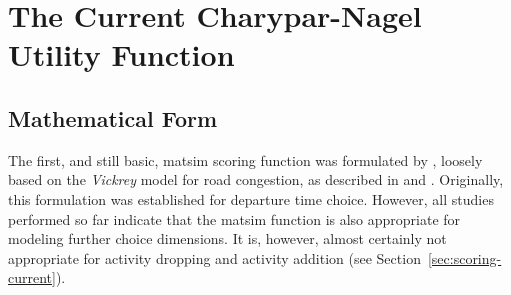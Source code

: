 \section{The Current Charypar-Nagel Utility Function}
\label{sec:charyparnagel}
\subsection{Mathematical Form}
\label{sec:mathematical-form}

The first, and still basic, \gls{matsim} scoring function was formulated by \citet[][]{CharyparNagel2005ga4acts}, loosely based on the \emph{Vickrey} model for road congestion, as described in \citet[][]{Vickrey_TAER_1969} and \citet[][]{ArnottEtAl_TAER_1993}. Originally, this formulation was established for departure time choice. However, all studies performed so far indicate that the \gls{matsim} function is also appropriate for modeling 
further choice dimensions.
%
It is, however, almost certainly not appropriate for activity dropping and activity addition (see Section~\ref{sec:scoring-current}).




